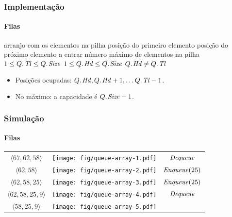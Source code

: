\documentclass{beamer}
\begin{document}
\begin{frame}

  \frametitle{Implementação}
  \framesubtitle{Filas}

  \begin{codebox}
    \zi {} \> \> \> \Comment arranjo com os elementos na pilha
    \zi {}   \> \> \> \Comment posição do primeiro elemento
    \zi {}   \> \> \> \Comment posição do próximo elemento a entrar
    \zi {} \> \> \> \Comment número máximo de elementos na pilha
    \zi $1 \le \attrib{Q}{Tl} \le \attrib{Q}{Size}$
    \zi $1 \le \attrib{Q}{Hd} \le \attrib{Q}{Size}$
    \zi $\attrib{Q}{Hd} \neq \attrib{Q}{Tl}$
  \end{codebox}
  \begin{itemize}
  \item Posições ocupadas: $\attrib{Q}{Hd}, \attrib{Q}{Hd}+1, \ldots
  \attrib{Q}{Tl}-1$.
  \item No máximo: a capacidade é $\attrib{Q}{Size} - 1$.
  \end{itemize}
  
\end{frame}

\begin{frame}
  \frametitle{Simulação}
  \framesubtitle{Filas}

  \begin{center}
    \begin{tabular}{ccc}
      $\langle 67, 62, 58 \rangle$ &
      \texttt{[image: fig/queue-array-1.pdf]}
      \pause
      &
      $\id{Dequeue}$ \pause
      \\
      $\langle 62, 58 \rangle$ &
      \texttt{[image: fig/queue-array-2.pdf]}
      \pause
      &
      $\id{Enqueue}(25)$ \pause
      \\
      $\langle 62, 58, 25 \rangle$ &
      \texttt{[image: fig/queue-array-3.pdf]}
      \pause
      &
      $\id{Enqueue}(25)$ \pause
      \\
      $\langle 62, 58, 25, 9 \rangle$ &
      \texttt{[image: fig/queue-array-4.pdf]}
      &
      $\id{Dequeue}$ \pause
      \\
      $\langle 58, 25, 9 \rangle$ &
      \texttt{[image: fig/queue-array-5.pdf]}
      &
    \end{tabular}
  \end{center}

\end{frame}
\end{document}
